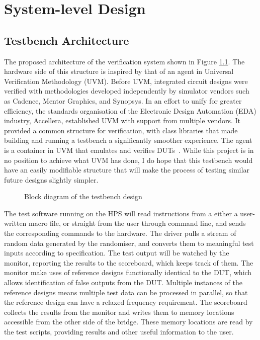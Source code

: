 \chapter{System-level Design}

\section{Testbench Architecture}
The proposed architecture of the verification system shown in Figure \ref{Block}.
The hardware side of this structure is inspired by that of an agent in Universal Verification Methodology (UVM).
Before UVM, integrated circuit designs were verified with methodologies developed independently by simulator vendors such as Cadence, Mentor Graphics, and Synopsys.
In an effort to unify for greater efficiency, the standards organisation of the Electronic Design Automation (EDA) industry, Accellera, established UVM with support from multiple vendors.
It provided a common structure for verification, with class libraries that made building and running a testbench a significantly smoother experience.
The agent is a container in UVM that emulates and verifies DUTs~\cite{Accellera1}.
While this project is in no position to achieve what UVM has done, I do hope that this testbench would have an easily modifiable structure that will make the process of testing similar future designs slightly simpler.

\begin{figure}[H]
  \centering
  
  \caption{Block diagram of the testbench design}
  \label{Block}
\end{figure}

The test software running on the HPS will read instructions from a either a user-written macro file, or straight from the user through command line, and sends the corresponding commands to the hardware.
The driver pulls a stream of random data generated by the randomiser, and converts them to meaningful test inputs according to specification.
The test output will be watched by the monitor, reporting the results to the scoreboard, which keeps track of them.
The monitor make uses of reference designs functionally identical to the DUT, which allows identification of false outputs from the DUT.
Multiple instances of the reference designs means multiple test data can be processed in parallel, so that the reference design can have a relaxed frequency requirement.
The scoreboard collects the results from the monitor and writes them to memory locations accessible from the other side of the bridge.
These memory locations are read by the test scripts, providing results and other useful information to the user.

